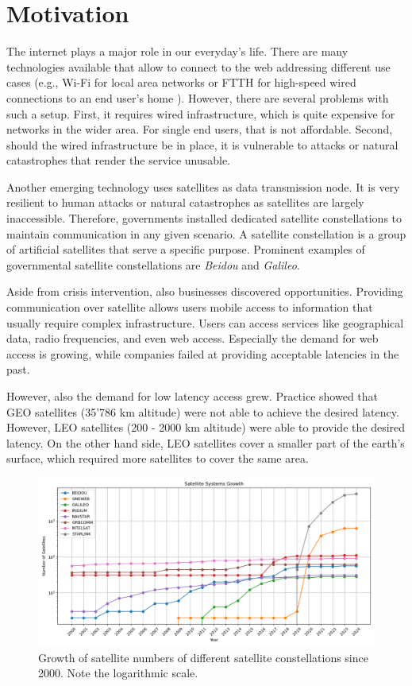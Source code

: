 \section{Motivation} \label{sec:motivation}

The internet plays a major role in our everyday's life. There are many technologies available that allow to connect to the web addressing different use cases (e.g., Wi-Fi for local area networks \cite{Henry2002} or \ac{FTTH} for high-speed wired connections to an end user's home \cite{Aleksic2010}).
However, there are several problems with such a setup. First, it requires wired infrastructure, which is quite expensive for networks in the wider area. For single end users, that is not affordable. Second, should the wired infrastructure be in place, it is vulnerable to attacks or natural catastrophes that render the service unusable.

Another emerging technology uses satellites as data transmission node. It is very resilient to human attacks or natural catastrophes as satellites are largely inaccessible. Therefore, governments installed dedicated satellite constellations to maintain communication in any given scenario. A satellite constellation is a group of artificial satellites that serve a specific purpose. Prominent examples of governmental satellite constellations are \textit{Beidou} and \textit{Galileo}.

Aside from crisis intervention, also businesses discovered opportunities. Providing communication over satellite allows users mobile access to information that usually require complex infrastructure. Users can access services like geographical data, radio frequencies, and even web access.
Especially the demand for web access is growing, while companies failed at providing acceptable latencies in the past.

However, also the demand for low latency access grew. Practice showed that \ac{GEO} satellites (35'786 km altitude) were not able to achieve the desired latency. However, \ac{LEO} satellites (200 - 2000 km altitude) were able to provide the desired latency. On the other hand side, \ac{LEO} satellites cover a smaller part of the earth's surface, which required more satellites to cover the same area.

\begin{figure}
	\label{fig:satellitegrowth}
	\centering
	\includegraphics[width=\textwidth]{./chapters/img/satellite-growth.png}
	\caption{Growth of satellite numbers of different satellite constellations since 2000. Note the logarithmic scale.}
\end{figure}


